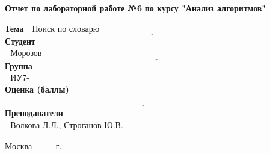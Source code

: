 \begin{titlepage}
	
	\begin{center}
		\Large\textbf{Отчет по лабораторной работе №6}
		\Large\textbf {по курсу "Анализ алгоритмов"}
	\end{center}
	
	\noindent\textbf{\newline Тема} $\underline{\text{~~Поиск по словарю~~~~~~~~~~~~~~~~~~~~~~~~~~~~~~~~~~~~~~~~~~~~~~~~~~~~~~~~~~~~~~~~}}$\newline\newline
	\noindent\textbf{Студент} $\underline{\text{~~Морозов Д.В.~~~~~~~~~~~~~~~~~~~~~~~~~~~~~~~~~~~~~~~~~~~~~~~~~~~~~~~~~~~~~~~~~~~~~~~~~~~~~~~~~~~~~~~~~}}$\newline\newline
	\noindent\textbf{Группа} $\underline{\text{~~ИУ7-52Б~~~~~~~~~~~~~~~~~~~~~~~~~~~~~~~~~~~~~~~~~~~~~~~~~~~~~~~~~~~~~~~~~~~~~~~~~~~~~~~~~~~~~~~~~~~~~~~~~}}$\newline\newline
	\noindent\textbf{Оценка (баллы)} $\underline{\text{~~~~~~~~~~~~~~~~~~~~~~~~~~~~~~~~~~~~~~~~~~~~~~~~~~~~~~~~~~~~~~~~~~~~~~~~~~~~~~~~~~~~~~~~~~~~~~~~~~~}}$\newline\newline
	\noindent\textbf{Преподаватели} $\underline{\text{~~Волкова Л.Л., Строганов Ю.В.~~~~~~~~~~~~~~~~~~~~~~~~~~~~~~~~~~~~~~~~~~~~~~~~~~~~~~~}}$\newline
	
	\begin{center}
		\vfill
		Москва~---~\the\year
		~г.
	\end{center}
\end{titlepage}

